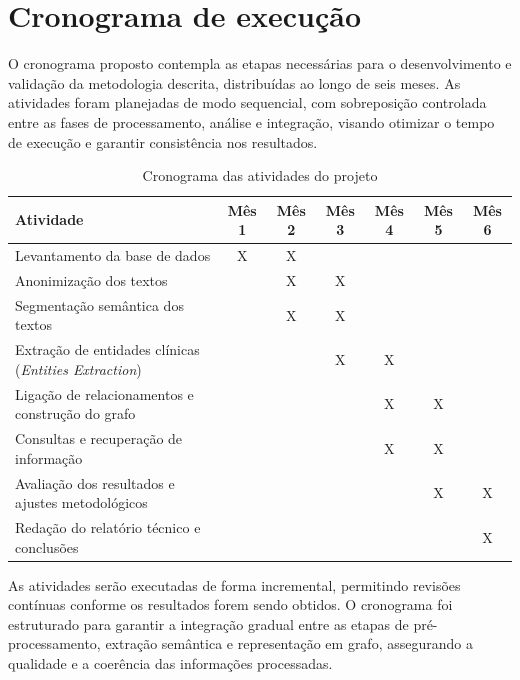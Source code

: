 \chapter{Cronograma de execução}\label{cap:cronograma}


O cronograma proposto contempla as etapas necessárias para o desenvolvimento e validação da metodologia descrita, distribuídas ao longo de seis meses. As atividades foram planejadas de modo sequencial, com sobreposição controlada entre as fases de processamento, análise e integração, visando otimizar o tempo de execução e garantir consistência nos resultados.

\begin{table}[H]
\centering
\caption{Cronograma das atividades do projeto}
\begin{tabular}{|p{5cm}|c|c|c|c|c|c|}
\hline
\textbf{Atividade} & \textbf{Mês 1} & \textbf{Mês 2} & \textbf{Mês 3} & \textbf{Mês 4} & \textbf{Mês 5} & \textbf{Mês 6} \\
\hline
Levantamento da base de dados & X & X & & & & \\
\hline
Anonimização dos textos & & X & X & & & \\
\hline
Segmentação semântica dos textos  & & X & X & & & \\
\hline
Extração de entidades clínicas (\textit{Entities Extraction}) & & & X & X & & \\
\hline
Ligação de relacionamentos e construção do grafo  & & & & X & X & \\
\hline
Consultas e recuperação de informação & & & & X & X & \\
\hline
Avaliação dos resultados e ajustes metodológicos & & & & & X & X \\
\hline
Redação do relatório técnico e conclusões & & & & & & X \\
\hline
\end{tabular}
\end{table}

As atividades serão executadas de forma incremental, permitindo revisões contínuas conforme os resultados forem sendo obtidos. O cronograma foi estruturado para garantir a integração gradual entre as etapas de pré-processamento, extração semântica e representação em grafo, assegurando a qualidade e a coerência das informações processadas.
